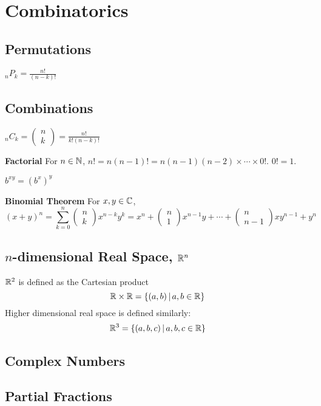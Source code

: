 \section{Combinatorics}

\subsection{Permutations}

$ _nP_k = \displaystyle{\frac{n!}{(n-k)!}}$

\subsection{Combinations}

$ _nC_k = \begin{pmatrix} n \\ k \end{pmatrix} = \displaystyle{\frac{n!}{k!(n-k)!}}$

\textbf{Factorial} For $n \in \mathbb{N}$, $n! = n(n-1)! = n(n-1)(n-2) \times \cdots \times 0!$. $0! = 1$.

$b^{xy}=(b^{x})^{y}$

	\textbf{Binomial Theorem} For $x, y \in \mathbb{C}$, $$(x+y)^n = \sum_{k=0}^n \begin{pmatrix} n \\ k \end{pmatrix} x^{n-k}y^k = x^{n} + \begin{pmatrix} n \\ 1 \end{pmatrix} x^{n-1}y + \cdots + \begin{pmatrix} n \\ n-1 \end{pmatrix} xy^{n-1} + y^n $$

	\subsection{$n$-dimensional Real Space, $\mathbb{R}^n$}

	$\mathbb{R}^2$ is defined as the Cartesian product $$\mathbb{R} \times \mathbb{R} = \{ (a,b) \, | \, a, b \in \mathbb{R} \}$$ Higher dimensional real space is defined similarly: $$\mathbb{R}^3 = \{ (a, b, c) \, | \, a, b, c \in \mathbb{R} \}$$

	\subsection{Complex Numbers}


	\subsection{Partial Fractions}

